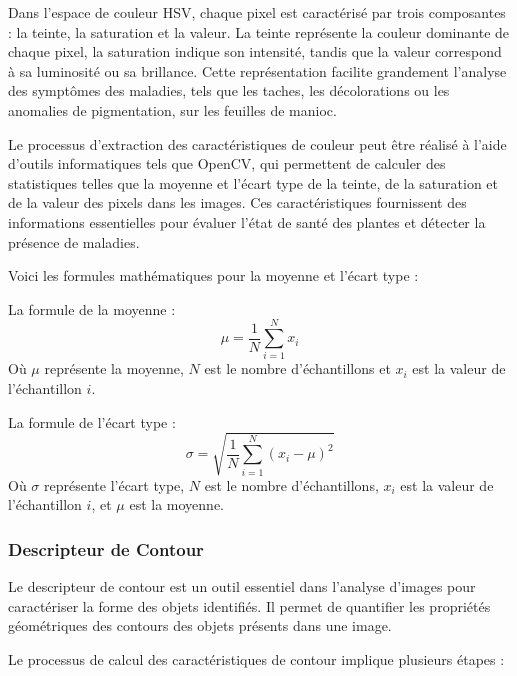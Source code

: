 Dans l'espace de couleur HSV, chaque pixel est caractérisé par trois composantes : la teinte, la saturation et la valeur. La teinte représente la couleur dominante de chaque pixel, la saturation indique son intensité, tandis que la valeur correspond à sa luminosité ou sa brillance. Cette représentation facilite grandement l'analyse des symptômes des maladies, tels que les taches, les décolorations ou les anomalies de pigmentation, sur les feuilles de manioc.

Le processus d'extraction des caractéristiques de couleur peut être réalisé à l'aide d'outils informatiques tels que OpenCV, qui permettent de calculer des statistiques telles que la moyenne et l'écart type de la teinte, de la saturation et de la valeur des pixels dans les images. Ces caractéristiques fournissent des informations essentielles pour évaluer l'état de santé des plantes et détecter la présence de maladies.

Voici les formules mathématiques pour la moyenne et l'écart type : 

La formule de la moyenne :
\[
\mu = \frac{1}{N} \sum_{i=1}^{N} x_i
\]
Où \( \mu \) représente la moyenne, \( N \) est le nombre d'échantillons et \( x_i \) est la valeur de l'échantillon \( i \).

La formule de l'écart type :
\[
\sigma = \sqrt{\frac{1}{N} \sum_{i=1}^{N} (x_i - \mu)^2}
\]
Où \( \sigma \) représente l'écart type, \( N \) est le nombre d'échantillons, \( x_i \) est la valeur de l'échantillon \( i \), et \( \mu \) est la moyenne.

\subsubsection{Descripteur de Contour}
Le descripteur de contour est un outil essentiel dans l'analyse d'images pour caractériser la forme des objets identifiés. Il permet de quantifier les propriétés géométriques des contours des objets présents dans une image.

Le processus de calcul des caractéristiques de contour implique plusieurs étapes :

